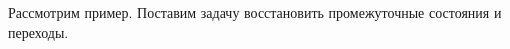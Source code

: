\begin{frame}[noframenumbering]
\frametitle{\insertsection} 
\framesubtitle{\insertsubsection}
Рассмотрим пример. Поставим задачу восстановить промежуточные состояния и переходы.
\inputminted{java}{code/StreamWithoutPeeks.java}
\end{frame}

